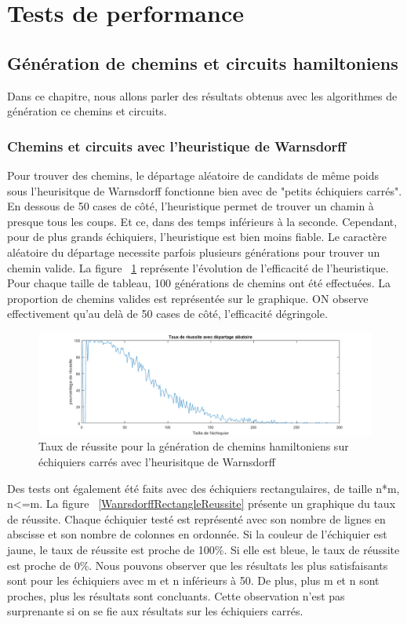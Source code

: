 \section{Tests de performance}
\subsection{Génération de chemins et circuits hamiltoniens}
Dans ce chapitre, nous allons parler des résultats obtenus avec les algorithmes de génération ce chemins et circuits.
\subsubsection{Chemins et circuits avec l'heuristique de Warnsdorff}
Pour trouver des chemins, le départage aléatoire de candidats de même poids sous l'heurisitque de Warnsdorff fonctionne bien avec de "petits échiquiers carrés". En dessous de 50 cases de côté, l'heuristique permet de trouver un chamin à presque tous les coups. Et ce, dans des temps inférieurs à la seconde. Cependant, pour de plus grands échiquiers, l'heuristique est bien moins fiable. Le caractère aléatoire du départage necessite parfois plusieurs générations pour trouver un chemin valide. La figure ~\ref{WanrsdorffCarreReussite} représente l'évolution de l'efficacité de l'heuristique. Pour chaque taille de tableau, 100 générations de chemins ont été effectuées. La proportion de chemins valides est représentée sur le graphique. ON observe effectivement qu'au delà de 50 cases de côté, l'efficacité dégringole.

\begin{figure}[h]
\begin{center}
   \includegraphics[scale=0.6]{img/WarnsdorffTauxReussiteCarre.png} 
   \caption{\label{WanrsdorffCarreReussite} Taux de réussite pour la génération de chemins hamiltoniens sur échiquiers carrés avec l'heurisitque de Warnsdorff}
   \end{center}
\end{figure}

Des tests ont également été faits avec des échiquiers rectangulaires, de taille n*m, n<=m. La figure ~\ref{WanrsdorffRectangleReussite} présente un graphique du taux de réussite. Chaque échiquier testé est représenté avec son nombre de lignes en abscisse et son nombre de colonnes en ordonnée. Si la couleur de l'échiquier est jaune, le taux de réussite est proche de 100\%. Si elle est bleue, le taux de réussite est proche de 0\%. Nous pouvons observer que les résultats les plus satisfaisants sont pour les échiquiers avec m et n inférieurs à 50. De plus, plus m et n sont proches, plus les résultats sont concluants. Cette observation n'est pas surprenante si on se fie aux résultats sur les échiquiers carrés.

